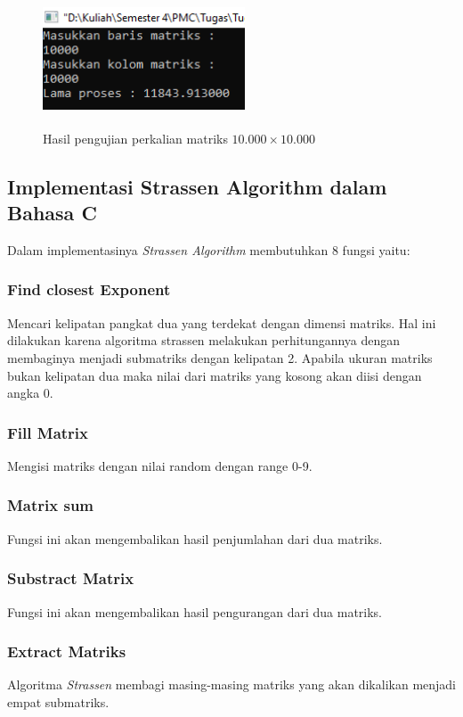 \documentclass[conference]{IEEEtran}
\begin{document}
\begin{figure}[h]
   \includegraphics[width = 6cm, height = 4cm]{Uji_Naive Algorithm_10k.png}
   \centering
   \caption{Hasil pengujian perkalian matriks $10.000\times10.000$}
\end{figure}

\subsection{Implementasi Strassen Algorithm dalam Bahasa C}
Dalam implementasinya \textit{Strassen Algorithm} membutuhkan 8 fungsi yaitu:

\subsubsection{Find closest Exponent} Mencari kelipatan pangkat dua yang terdekat dengan dimensi matriks. Hal ini dilakukan karena algoritma strassen melakukan
perhitungannya dengan membaginya menjadi submatriks dengan kelipatan 2. Apabila ukuran matriks bukan kelipatan dua maka nilai dari matriks yang kosong akan diisi dengan
angka 0.

\subsubsection{Fill Matrix} Mengisi matriks dengan nilai random dengan range 0-9.

\subsubsection{Matrix sum} Fungsi ini akan mengembalikan hasil penjumlahan dari dua matriks.

\subsubsection{Substract Matrix} Fungsi ini akan mengembalikan hasil pengurangan dari dua matriks.

\subsubsection{Extract Matriks} Algoritma \textit{Strassen} membagi masing-masing matriks yang akan dikalikan menjadi empat submatriks.
\end{document}

